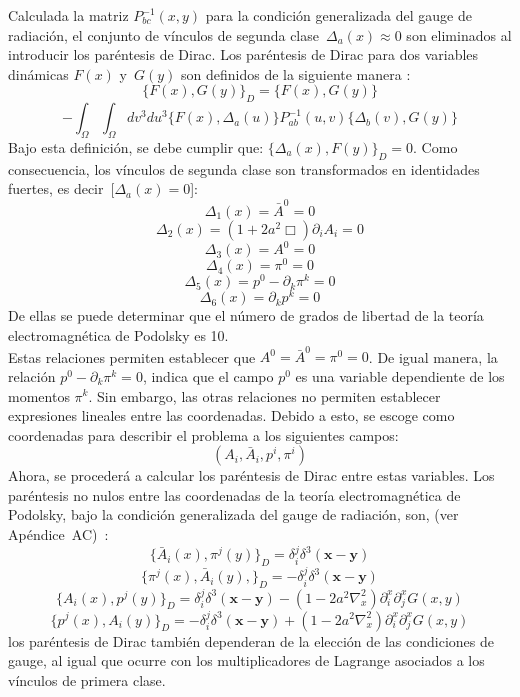 \documentclass[a4paper,12pt]{article}
\begin{document}
Calculada la matriz $P_{bc}^{-1}(x,y)$ para la condición generalizada del gauge de radiación, el conjunto de vínculos de segunda \mbox{clase  $\Delta_a(x)\approx0$} son eliminados al introducir los paréntesis de Dirac. Los paréntesis de Dirac para dos variables dinámicas $F(x)$ \mbox{y $G(y)$} son definidos de la siguiente manera \cite{podolsky,dirac,puebla,Merilin}:
\begin{equation}
\{F(x),G(y)\}_D=\{F(x),G(y)\}
\label{pardir}
\end{equation}
$$-\int_{\Omega}\int_\Omega dv^3du^3\{F(x),\Delta_a(u)\}P_{ab}^{-1}(u,v)\{\Delta_b(v),G(y)\}$$  
Bajo esta definición, se debe cumplir que: $\{\Delta_a(x),F(y)\}_D=0$. Como consecuencia, los vínculos de segunda clase son transformados en identidades fuertes, es \mbox{decir [$\Delta_a(x)=0$]:}
\begin{equation}
\Delta_1(x)=\bar{A}^0=0
\label{idefuer}
\end{equation}
$$\Delta_2(x)= (1+2a^2\Box)\partial_i A_i=0 $$
$$ \Delta_3(x)= A^0=0$$
$$\Delta_4(x)=\pi^0=0$$
$$\Delta_5(x)=p^0-\partial_k\pi^k=0$$
$$\Delta_6(x)=\partial_kp^{k}=0 $$
De ellas se puede determinar que el número de grados de libertad de la teoría electromagnética de Podolsky es 10.
\\

Estas relaciones permiten establecer que $A^0=\bar{A}^0=\pi^0=0$. De igual manera, la relación $p^0-\partial_k\pi^k=0$, indica que el campo $p^0$ es una variable dependiente de los momentos $\pi^k$. Sin embargo, las otras relaciones no permiten establecer expresiones lineales entre las coordenadas. Debido a esto, se escoge como coordenadas para describir el problema a los siguientes campos:  
\begin{equation}
(A_i,\bar{A}_i,p^i,\pi^i) 
\end{equation}
Ahora, se procederá a calcular los paréntesis de Dirac entre estas variables. Los paréntesis no nulos entre las coordenadas de la teoría electromagnética de Podolsky, bajo la condición generalizada del gauge de radiación, son, (ver \mbox{Apéndice AC) \cite{podolsky}:} 
\begin{equation}
\{\bar{A}_i(x),\pi^j(y)\}_D=\delta_i^j\delta^3(\textbf{x}-\textbf{y}) 
\label{paredir}
\end{equation}
$$\{\pi^j(x),\bar{A}_i(y),\}_D=-\delta_i^j\delta^3(\textbf{x}-\textbf{y})$$
$$\{A_i(x),p^j(y)\}_D=\delta^j_i\delta^3(\textbf{x}-\textbf{y})-(1-2a^2\nabla^2_x)\partial_i^x\partial_j^xG(x,y)$$
$$\{p^j(x),A_i(y)\}_D=-\delta^j_i\delta^3(\textbf{x}-\textbf{y})+(1-2a^2\nabla^2_x)\partial_i^x\partial_j^xG(x,y)$$
los paréntesis de Dirac también dependeran de la elección de las condiciones de gauge, al igual que ocurre con los multiplicadores de Lagrange asociados a los vínculos de primera clase. 
\\
\end{document}
